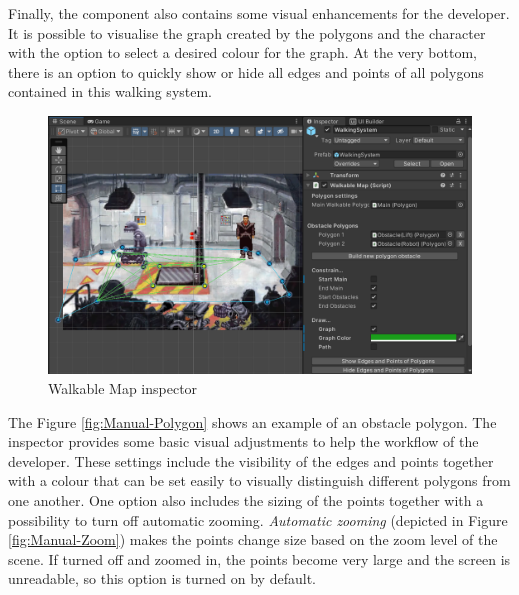 Finally, the component also contains some visual enhancements for the developer. It is possible to visualise the graph created by the polygons and the character with the option to select a desired colour for the graph. At the very bottom, there is an option to quickly show or hide all edges and points of all polygons contained in this walking system. 
\begin{figure}[H]
\centering
\includegraphics[width=1\linewidth]{img/User doc/walkable_map.png}
\caption{Walkable Map inspector}
\label{fig:Manual-WM}
\end{figure}

The Figure \ref{fig:Manual-Polygon} shows an example of an obstacle polygon. The inspector provides some basic visual adjustments to help the workflow of the developer. These settings include the visibility of the edges and points together with a colour that can be set easily to visually distinguish different polygons from one another. One option also includes the sizing of the points together with a possibility to turn off automatic zooming. \textit{Automatic zooming} (depicted in Figure \ref{fig:Manual-Zoom}) makes the points change size based on the zoom level of the scene. If turned off and zoomed in, the points become very large and the screen is unreadable, so this option is turned on by default.

